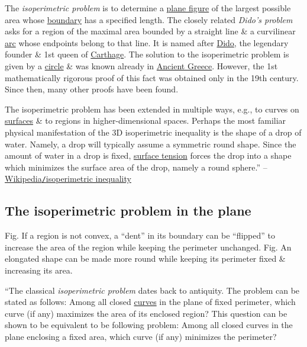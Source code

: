 \documentclass[oneside]{book}
\numberwithin{equation}{section}
\begin{document}
The \textit{isoperimetric problem} is to determine a \href{https://en.wikipedia.org/wiki/Plane_figure}{plane figure} of the largest possible area whose \href{https://en.wikipedia.org/wiki/Boundary_(topology)}{boundary} has a specified length. The closely related \textit{Dido's problem} asks for a region of the maximal area bounded by a straight line \& a curvilinear \href{https://en.wikipedia.org/wiki/Arc_(geometry)}{arc} whose endpoints belong to that line. It is named after \href{https://en.wikipedia.org/wiki/Dido_(Queen_of_Carthage)}{Dido}, the legendary founder \& 1st queen of \href{https://en.wikipedia.org/wiki/Carthage}{Carthage}. The solution to the isoperimetric problem is given by a \href{https://en.wikipedia.org/wiki/Circle}{circle} \& was known already in \href{https://en.wikipedia.org/wiki/Ancient_Greece}{Ancient Greece}. However, the 1st mathematically rigorous proof of this fact was obtained only in the 19th century. Since then, many other proofs have been found.

The isoperimetric problem has been extended in multiple ways, e.g., to curves on \href{https://en.wikipedia.org/wiki/Differential_geometry_of_surfaces}{surfaces} \& to regions in higher-dimensional spaces. Perhaps the most familiar physical manifestation of the 3D isoperimetric inequality is the shape of a drop of water. Namely, a drop will typically assume a symmetric round shape. Since the amount of water in a drop is fixed, \href{https://en.wikipedia.org/wiki/Surface_tension}{surface tension} forces the drop into a shape which minimizes the surface area of the drop, namely a round sphere.'' -- \href{https://en.wikipedia.org/wiki/Isoperimetric_inequality}{Wikipedia\texttt{/}isoperimetric inequality}

\subsection{The isoperimetric problem in the plane}
\textsf{Fig. If a region is not convex, a ``dent'' in its boundary can be ``flipped'' to increase the area of the region while keeping the perimeter unchanged.} \textsf{Fig. An elongated shape can be made more round while keeping its perimeter fixed \& increasing its area.}

``The classical \textit{isoperimetric problem} dates back to antiquity. The problem can be stated as follows: Among all closed \href{https://en.wikipedia.org/wiki/Curve}{curves} in the plane of fixed perimeter, which curve (if any) maximizes the area of its enclosed region? This question can be shown to be equivalent to be following problem: Among all closed curves in the plane enclosing a fixed area, which curve (if any) minimizes the perimeter?
\end{document}

